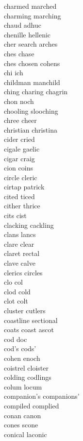 charmed marched\\
charming marching\\
chaud adhuc\\
chenille hellenic\\
cher search arches  \\
ches chase \\
ches chosen cohens  \\
chi ich\\
childman manchild\\
ching charing chagrin  \\
chon noch\\
chooling slooching \\
chree cheer\\
christian christina\\
cider cried\\
cigale gaelic\\
cigar craig\\
cion coins \\
circle cleric\\
cirtap patrick \\
cited ticed\\
cither thrice\\
cits cist\\
clacking cackling\\
clans lancs\\
clare clear\\
claret rectal\\
clave calve\\
clerics circles\\
clo col\\
clod cold\\
clot colt\\
cluster cutlers\\
coastline sectional\\
coats coast ascot\\
cod doc\\
cod's cods'\\
cohen enoch\\
coistrel cloister\\
colding codlings \\
colum locum\\
companion's companions'\\
compiled complied\\
conan canon\\
cones scone\\
conical laconic\\
